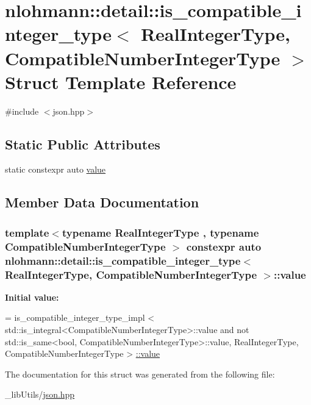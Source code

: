 \hypertarget{structnlohmann_1_1detail_1_1is__compatible__integer__type}{}\section{nlohmann\+:\+:detail\+:\+:is\+\_\+compatible\+\_\+integer\+\_\+type$<$ Real\+Integer\+Type, Compatible\+Number\+Integer\+Type $>$ Struct Template Reference}
\label{structnlohmann_1_1detail_1_1is__compatible__integer__type}


{\ttfamily \#include $<$json.\+hpp$>$}

\subsection*{Static Public Attributes}
\begin{DoxyCompactItemize}
\item 
static constexpr auto \hyperlink{structnlohmann_1_1detail_1_1is__compatible__integer__type_ac5e5bd39773676564c73d3dd2a9c6e0a}{value}
\end{DoxyCompactItemize}


\subsection{Member Data Documentation}
\subsubsection[{\texorpdfstring{value}{value}}]{\setlength{\rightskip}{0pt plus 5cm}template$<$typename Real\+Integer\+Type , typename Compatible\+Number\+Integer\+Type $>$ constexpr auto {\bf nlohmann\+::detail\+::is\+\_\+compatible\+\_\+integer\+\_\+type}$<$ Real\+Integer\+Type, Compatible\+Number\+Integer\+Type $>$\+::value\hspace{0.3cm}{\ttfamily [static]}}\hypertarget{structnlohmann_1_1detail_1_1is__compatible__integer__type_ac5e5bd39773676564c73d3dd2a9c6e0a}{}\label{structnlohmann_1_1detail_1_1is__compatible__integer__type_ac5e5bd39773676564c73d3dd2a9c6e0a}
{\bfseries Initial value\+:}
\begin{DoxyCode}
=
        is\_compatible\_integer\_type\_impl <
        std::is\_integral<CompatibleNumberIntegerType>::value and
        not std::is\_same<bool, CompatibleNumberIntegerType>::value,
        RealIntegerType, CompatibleNumberIntegerType > \hyperlink{structnlohmann_1_1detail_1_1is__compatible__integer__type_ac5e5bd39773676564c73d3dd2a9c6e0a}{::value}
\end{DoxyCode}


The documentation for this struct was generated from the following file\+:\begin{DoxyCompactItemize}
\item 
\+\_\+lib\+Utils/\hyperlink{json_8hpp}{json.\+hpp}\end{DoxyCompactItemize}
